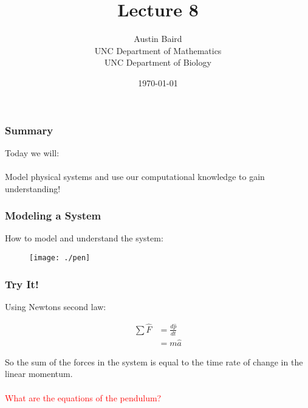 \documentclass[serif]{beamer}
\title{Lecture 8}
\author{Austin Baird\\UNC Department of Mathematics\\UNC Department of Biology}
\date{\today}
\begin{document}
\frame{\titlepage}

\begin{frame}
\frametitle{Summary}

Today we will: 
\ \\
\ \\
Model physical systems and use our computational knowledge to gain understanding! 

\end{frame}

\begin{frame}
\frametitle{Modeling a System}

How to model and understand the system: 

\begin{figure}
\texttt{[image: ./pen]}
\end{figure}

\end{frame}


\begin{frame}
\frametitle{Try It!}

Using Newtons second law: 

\begin{align*}
\sum \hat{F} &= \frac{d \hat{p}}{dt}\\
& = m\hat{a}
\end{align*}

So the sum of the forces in the system is equal to the time rate of change in the linear momentum. \\
\ \\
\textcolor{red}{What are the equations of the pendulum?}

\end{frame}


\end{document}
